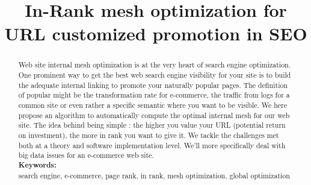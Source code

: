 \documentclass{iSWAGArticle}
\title{In-Rank mesh optimization for URL customized promotion in SEO}
\author{\iSWAGAuthor{Stefan Duprey\\
Cdiscount\\
stefan.duprey@cdiscount.com} \and \iSWAGAuthor{Fabien Jaunas\\
Cdiscount\\
fabien.jaunas@cdiscount.com}}
\begin{document}
\maketitle
\begin{abstract}
 Web site internal mesh optimization is at the very heart of search engine optimization. 
 One prominent way to get the best web search engine visibility for your site 
 is to build the adequate internal linking to promote your naturally popular pages. 
 The definition of popular might be the transformation rate for e-commerce, 
 the traffic from logs for a common site or even rather a specific semantic where you want to be visible. 
 We here propose an algorithm to automatically compute the optimal internal mesh for our web site. The idea
 behind being simple : the higher you value your URL (potential return on investment), the more in rank you want to give it.
 We tackle the challenges met both at a theory and software implementation level. 
 We'll more specifically deal with big data issues for an e-commerce web site.
 \\\newline
 \indent \textbf{Keywords: }
 \\\newline
search engine, e-commerce, page rank, in rank, mesh optimization, global optimization
\end{abstract}
\end{document}
